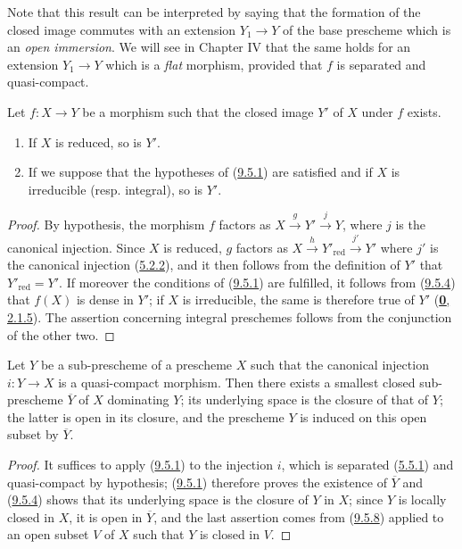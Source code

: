 Note that this result can be interpreted by saying that the formation of
the closed image commutes with an extension $Y_1\to Y$ of the base
prescheme which is an \emph{open immersion}. We will see in Chapter IV that
the same holds for an extension $Y_1\to Y$ which is a \emph{flat} morphism,
provided that $f$ is separated and quasi-compact.

\begin{proposition}[9.5.9]
\label{I.9.5.9}
Let $f:X\to Y$ be a morphism such that the closed image $Y'$ of $X$ under
$f$ exists.
\begin{enumerate}
  \item[\textup{(i)}] If $X$ is reduced, so is $Y'$.
  \item[\textup{(ii)}] If we suppose that the hypotheses of
    \textup{(\hyperref[I.9.5.1]{9.5.1})} are satisfied and if $X$ is irreducible
    \textup{(resp.} integral), so is $Y'$.
\end{enumerate}
\end{proposition}

\begin{proof}
By hypothesis, the morphism $f$ factors as
$X\xrightarrow{g}Y'\xrightarrow{j}Y$, where $j$ is the canonical injection.
Since $X$ is reduced, $g$ factors as
$X\xrightarrow{h}Y'_{\mathrm{red}}\xrightarrow{j'}Y'$ where $j'$ is
the canonical injection (\hyperref[I.5.2.2]{5.2.2}), and it then follows
from the definition of $Y'$ that $Y'_{\mathrm{red}}=Y'$. If moreover the
conditions of (\hyperref[I.9.5.1]{9.5.1}) are fulfilled, it follows from
(\hyperref[I.9.5.4]{9.5.4}) that $f(X)$ is dense in $Y'$; if $X$ is
irreducible, the same is therefore true of $Y'$
(\hyperref[0.2.1.5]{\textbf{0}, 2.1.5}). The assertion concerning integral
preschemes follows from the conjunction of the other two.
\end{proof}

\begin{proposition}[9.5.10]
\label{I.9.5.10}
Let $Y$ be a sub-prescheme of a prescheme $X$ such that the canonical
injection $i:Y\to X$ is a quasi-compact morphism. Then there exists a
smallest closed sub-prescheme $\overline{Y}$ of $X$ dominating $Y$; its
underlying space is the closure of that of $Y$; the latter is open in its
closure, and the prescheme $Y$ is induced on this open subset by
$\overline{Y}$.
\end{proposition}

\begin{proof}
It suffices to apply (\hyperref[I.9.5.1]{9.5.1}) to the injection $i$,
which is separated (\hyperref[I.5.5.1]{5.5.1}) and quasi-compact by
hypothesis; (\hyperref[I.9.5.1]{9.5.1}) therefore proves the existence of
$\overline{Y}$ and (\hyperref[I.9.5.4]{9.5.4}) shows that its underlying
space is the closure of $Y$ in $X$; since $Y$ is locally closed in $X$, it
is open in $\overline{Y}$, and the last assertion comes from
(\hyperref[I.9.5.8]{9.5.8}) applied to an open subset $V$ of $X$ such
that $Y$ is closed in $V$.
\end{proof}

